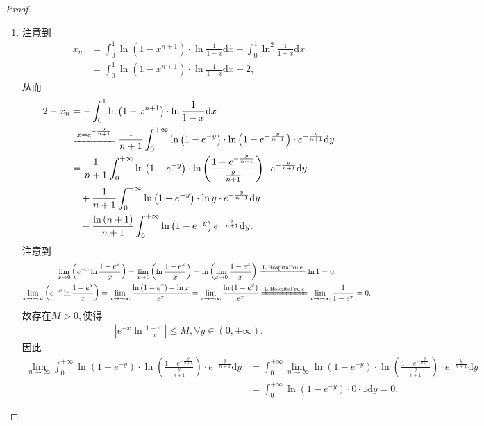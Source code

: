 \documentclass[../../main.tex]{subfiles}%
\begin{document}
\begin{proof}
\begin{enumerate}[(1)]
\item 注意到
\begin{align*}
x_n&=\int_0^1 \ln \left( 1-x^{n+1} \right) \cdot \ln \frac{1}{1-x}\mathrm{d}x+\int_0^1 \ln ^2\frac{1}{1-x}\mathrm{d}x\\
&=\int_0^1 \ln \left( 1-x^{n+1} \right) \cdot \ln \frac{1}{1-x}\mathrm{d}x+2,
\end{align*}
从而
\begin{align}
2-x_n&=-\int_0^1 \ln \left( 1-x^{n+1} \right) \cdot \ln \frac{1}{1-x}\mathrm{d}x \nonumber \\
&\xlongequal{x=e^{-\frac{y}{n+1}}}\frac{1}{n+1}\int_0^{+\infty} \ln \left( 1-e^{-y} \right) \cdot \ln \left( 1-e^{-\frac{y}{n+1}} \right) \cdot e^{-\frac{y}{n+1}}\mathrm{d}y\nonumber \\
&=\frac{1}{n+1}\int_0^{+\infty} \ln \left( 1-e^{-y} \right) \cdot \ln \left( \frac{1-e^{-\frac{y}{n+1}}}{\frac{y}{n+1}} \right) \cdot e^{-\frac{y}{n+1}}\mathrm{d}y \nonumber \\
&\quad +\frac{1}{n+1}\int_0^{+\infty} \ln \left( 1-e^{-y} \right) \cdot \ln y\cdot e^{-\frac{y}{n+1}}\mathrm{d}y \nonumber \\
&\quad -\frac{\ln \left( n+1 \right)}{n+1}\int_0^{+\infty} \ln \left( 1-e^{-y} \right) e^{-\frac{y}{n+1}}\mathrm{d}y. \label{eq:123.123123123}
\end{align}
注意到
\begin{gather*}
\lim_{x\rightarrow 0} \left( e^{-x}\ln \frac{1-e^x}{x} \right) =\lim_{x\rightarrow 0} \left( \ln \frac{1-e^x}{x} \right) =\ln \left( \lim_{x\rightarrow 0} \frac{1-e^x}{x} \right) \xlongequal{\text{L'Hospital'rule}}\ln 1=0,
\\
\lim_{x\rightarrow +\infty} \left( e^{-x}\ln \frac{1-e^x}{x} \right) =\lim_{x\rightarrow +\infty} \frac{\ln \left( 1-e^x \right) -\ln x}{e^x}=\lim_{x\rightarrow +\infty} \frac{\ln \left( 1-e^x \right)}{e^x}\xlongequal{\text{L'Hospital'rule}}\lim_{x\rightarrow +\infty} \frac{1}{1-e^x}=0.
\end{gather*}
故存在$M>0,$使得
\begin{align*}
\left| e^{-x}\ln \frac{1-e^x}{x} \right|\leqslant M,\forall y\in \left( 0,+\infty \right) .
\end{align*}
因此
\begin{align*}
\lim\limits_{n\rightarrow \infty}\int_0^{+\infty} \ln \left( 1-e^{-y} \right) \cdot \ln \left( \frac{1-e^{-\frac{y}{n+1}}}{\frac{y}{n+1}} \right) \cdot e^{-\frac{y}{n+1}}\mathrm{d}y&=\int_0^{+\infty} \lim\limits_{n\rightarrow \infty}\ln \left( 1-e^{-y} \right) \cdot \ln \left( \frac{1-e^{-\frac{y}{n+1}}}{\frac{y}{n+1}} \right) \cdot e^{-\frac{y}{n+1}}\mathrm{d}y\\
&=\int_0^{+\infty} \ln \left( 1-e^{-y} \right) \cdot 0\cdot 1\mathrm{d}y=0.
\end{align*}


\end{enumerate}
\end{proof}
\end{document}
